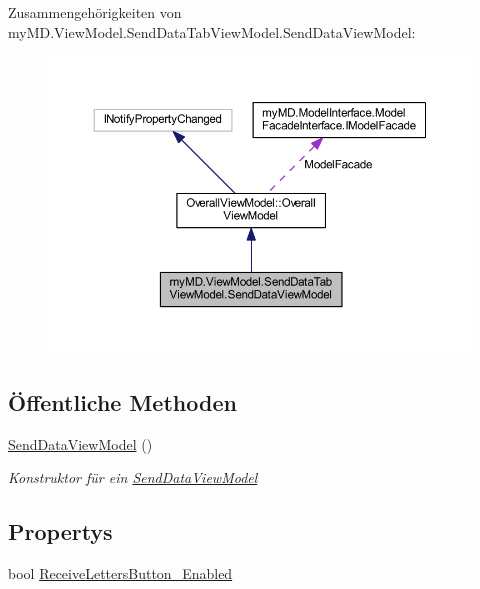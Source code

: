 Zusammengehörigkeiten von my\+M\+D.\+View\+Model.\+Send\+Data\+Tab\+View\+Model.\+Send\+Data\+View\+Model\+:
\nopagebreak
\begin{figure}[H]
\begin{center}
\leavevmode
\includegraphics[width=350pt]{classmy_m_d_1_1_view_model_1_1_send_data_tab_view_model_1_1_send_data_view_model__coll__graph}
\end{center}
\end{figure}
\subsection*{Öffentliche Methoden}
\begin{DoxyCompactItemize}
\item 
\mbox{\hyperlink{classmy_m_d_1_1_view_model_1_1_send_data_tab_view_model_1_1_send_data_view_model_abdf1a8159aac4d3f726a307fc37ca6b6}{Send\+Data\+View\+Model}} ()
\begin{DoxyCompactList}\small\item\em Konstruktor für ein \mbox{\hyperlink{classmy_m_d_1_1_view_model_1_1_send_data_tab_view_model_1_1_send_data_view_model}{Send\+Data\+View\+Model}} \end{DoxyCompactList}\end{DoxyCompactItemize}
\subsection*{Propertys}
\begin{DoxyCompactItemize}
\item 
bool \mbox{\hyperlink{classmy_m_d_1_1_view_model_1_1_send_data_tab_view_model_1_1_send_data_view_model_a0e92b77382f44a685bf8004a02fb91ce}{Receive\+Letters\+Button\+\_\+\+Enabled}}
\end{DoxyCompactItemize}

